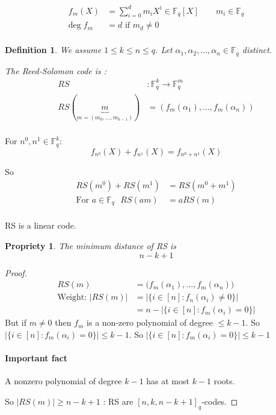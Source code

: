 \documentclass{article}
\newtheorem{prop}{Propriety}
\newtheorem{defi}{Definition}
\begin{document}
\begin{align*}
f_m(X) & =\sum_{i=0}^d m_iX^i \in \mathbb{F}_q[X] \qquad m_i\in \mathbb{F}_q \\
\text{deg}\; f_m & = d \text{ if }m_d\neq 0\\
\end{align*}

\begin{defi}
We assume $1\leq k \leq n \leq q$. Let $\alpha_1, \alpha_2, ..., \alpha_n \in \mathbb{F}_q$ distinct.

The Reed-Solomon code is :
\begin{align*}
RS &: \mathbb{F}_q^k \to \mathbb{F}_q^m\\
RS(\underbrace{m}_{m=(m_0,...,m_{k-1})}) & = (f_m(\alpha_1),...,f_m(\alpha_n) )\\
\end{align*}
\end{defi}

For $n^0, n^1 \in \mathbb{F}_q^k$:
\[f_{n^0}(X) + f_{n^1}(X) = f_{n^0 + n^1}(X)\]

So 
\begin{align*}
RS(m^0) + RS(m^1) & = RS(m^0 + m^1)\\
\text{For $a\in \mathbb{F}_q$ } RS(am) &= aRS(m)\\
\end{align*}

RS is a linear code.

\begin{prop}
The minimum distance of RS is
\[n-k+1\]
\end{prop}

\begin{proof}
\begin{align*}
RS(m) & = \big( f_m(\alpha_1),...,f_m(\alpha_n) \big)\\
\text{Weight: } |RS(m)|&= | \{ i\in [n] : f_n(\alpha_i)\neq 0 \} |\\
& = n - |\{ i \in [n]: f_m(\alpha_i) = 0\}|
\end{align*}
But if $m\neq 0$ then $f_m$ is a non-zero polynomial of degree $\leq k-1$. So $|\{ i \in [n]: f_m(\alpha_i) = 0 \} | \leq k-1$. So $|\{i \in [n] : f_m(\alpha_i)=0\}|\leq k-1$

\paragraph{Important fact} A nonzero polynomial of degree $k-1$ has at most $k-1$ roots.

So $|RS(m)|\geq n-k+1$ : RS are $[n,k,n-k+1]_q$-codes.
\end{proof}
\end{document}
